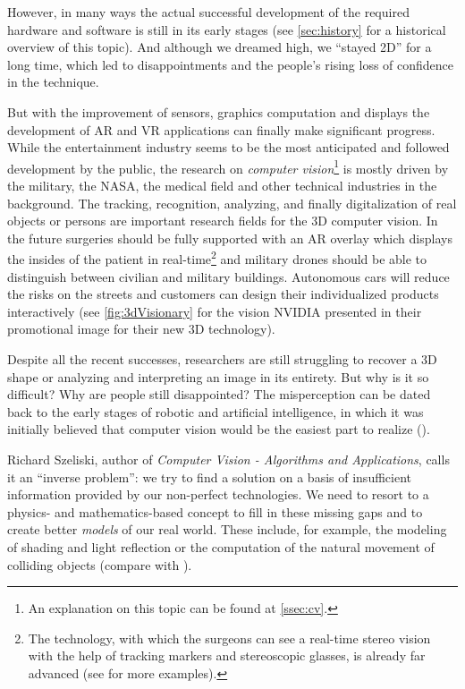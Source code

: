 However, in many ways the actual successful development of the required hardware and software is still in its early stages (see \autoref{sec:history} for a historical overview of this topic). And although we dreamed high, we \enquote{stayed 2D} for a long time, which led to disappointments and the people's rising loss of confidence in the technique.

But with the improvement of sensors, graphics computation and displays the development of AR and VR applications can finally make significant progress. While the entertainment industry seems to be the most anticipated and followed development by the public, the research on \textit{computer vision}\footnote{An explanation on this topic can be found at \autoref{ssec:cv}.} is mostly driven by the military, the NASA, the medical field and other technical industries in the background. The tracking, recognition, analyzing, and finally digitalization of real objects or persons are important research fields for the 3D computer vision. In the future surgeries should be fully supported with an AR overlay which displays the insides of the patient in real-time\footnote{The technology, with which the surgeons can see a real-time stereo vision with the help of tracking markers and stereoscopic glasses, is already far advanced (see \cite{Lowe.2016} for more examples).} and military drones should be able to distinguish between civilian and military buildings. Autonomous cars will reduce the risks on the streets and customers can design their individualized products interactively (see \autoref{fig:3dVisionary} for the vision NVIDIA presented in their promotional image for their new 3D technology).

Despite all the recent successes, researchers are still struggling to recover a 3D shape or analyzing and interpreting an image in its entirety. But why is it so difficult? Why are people still disappointed? The misperception can be dated back to the early stages of robotic and artificial intelligence, in which it was initially believed that computer vision would be the easiest part to realize (\cite[p.5]{Szeliski.2011}). 

Richard Szeliski, author of \textit{Computer Vision - Algorithms and Applications}, calls it an \enquote{inverse problem}: we try to find a solution on a basis of insufficient information provided by our non-perfect technologies. We need to resort to a physics- and mathematics-based concept to fill in these missing gaps and to create better \textit{models} of our real world. These include, for example, the modeling of shading and light reflection or the computation of the natural movement of colliding objects (compare with \cite[p.3 et seqq.]{Szeliski.2011}).  

